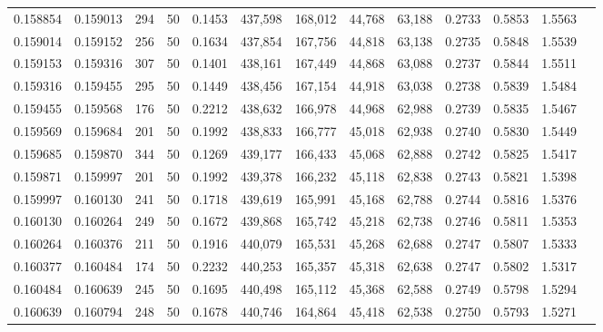 \begin{tabular}{rrrrrrrrrrrrr}
0.158854 & 0.159013 &   294 &  50 &                                     0.1453 & 437,598 & 168,012 &  44,768 &  63,188 & 0.2733 & 0.5853 & 1.5563 \\
0.159014 & 0.159152 &   256 &  50 &                                     0.1634 & 437,854 & 167,756 &  44,818 &  63,138 & 0.2735 & 0.5848 & 1.5539 \\
0.159153 & 0.159316 &   307 &  50 &                                     0.1401 & 438,161 & 167,449 &  44,868 &  63,088 & 0.2737 & 0.5844 & 1.5511 \\
0.159316 & 0.159455 &   295 &  50 &                                     0.1449 & 438,456 & 167,154 &  44,918 &  63,038 & 0.2738 & 0.5839 & 1.5484 \\
0.159455 & 0.159568 &   176 &  50 &                                     0.2212 & 438,632 & 166,978 &  44,968 &  62,988 & 0.2739 & 0.5835 & 1.5467 \\
0.159569 & 0.159684 &   201 &  50 &                                     0.1992 & 438,833 & 166,777 &  45,018 &  62,938 & 0.2740 & 0.5830 & 1.5449 \\
0.159685 & 0.159870 &   344 &  50 &                                     0.1269 & 439,177 & 166,433 &  45,068 &  62,888 & 0.2742 & 0.5825 & 1.5417 \\
0.159871 & 0.159997 &   201 &  50 &                                     0.1992 & 439,378 & 166,232 &  45,118 &  62,838 & 0.2743 & 0.5821 & 1.5398 \\
0.159997 & 0.160130 &   241 &  50 &                                     0.1718 & 439,619 & 165,991 &  45,168 &  62,788 & 0.2744 & 0.5816 & 1.5376 \\
0.160130 & 0.160264 &   249 &  50 &                                     0.1672 & 439,868 & 165,742 &  45,218 &  62,738 & 0.2746 & 0.5811 & 1.5353 \\
0.160264 & 0.160376 &   211 &  50 &                                     0.1916 & 440,079 & 165,531 &  45,268 &  62,688 & 0.2747 & 0.5807 & 1.5333 \\
0.160377 & 0.160484 &   174 &  50 &                                     0.2232 & 440,253 & 165,357 &  45,318 &  62,638 & 0.2747 & 0.5802 & 1.5317 \\
0.160484 & 0.160639 &   245 &  50 &                                     0.1695 & 440,498 & 165,112 &  45,368 &  62,588 & 0.2749 & 0.5798 & 1.5294 \\
0.160639 & 0.160794 &   248 &  50 &                                     0.1678 & 440,746 & 164,864 &  45,418 &  62,538 & 0.2750 & 0.5793 & 1.5271 \\

\end{tabular}
